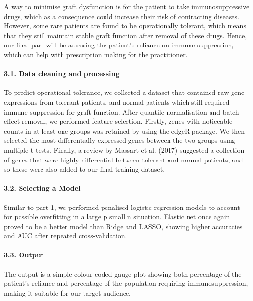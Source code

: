 \documentclass[a4paper,9pt,twocolumn,twoside,]{pinp}
\begin{document}
A way to minimise graft dysfunction is for the patient to take
immunosuppressive drugs, which as a consequence could increase their
risk of contracting diseases. However, some rare patients are found to
be operationally tolerant, which means that they still maintain stable
graft function after removal of these drugs. Hence, our final part will
be assessing the patient's reliance on immune suppression, which can
help with prescription making for the practitioner.

\hypertarget{data-cleaning-and-processing-2}{%
\paragraph{3.1. Data cleaning and
processing}\label{data-cleaning-and-processing-2}}

To predict operational tolerance, we collected a dataset that contained
raw gene expressions from tolerant patients, and normal patients which
still required immune suppression for graft function. After quantile
normalisation and batch effect removal, we performed feature selection.
Firstly, genes with noticeable counts in at least one groups was
retained by using the edgeR package. We then selected the most
differentially expressed genes between the two groups using multiple
t-tests. Finally, a review by Massart et al. (2017) suggested a
collection of genes that were highly differential between tolerant and
normal patients, and so these were also added to our final training
dataset.

\hypertarget{selecting-a-model-1}{%
\paragraph{3.2. Selecting a Model}\label{selecting-a-model-1}}

Similar to part 1, we performed penalised logistic regression models to
account for possible overfitting in a large p small n situation. Elastic
net once again proved to be a better model than Ridge and LASSO, showing
higher accuracies and AUC after repeated cross-validation.

\hypertarget{output-2}{%
\paragraph{3.3. Output}\label{output-2}}

The output is a simple colour coded gauge plot showing both percentage
of the patient's reliance and percentage of the population requiring
immunosuppression, making it suitable for our target audience.
\end{document}
